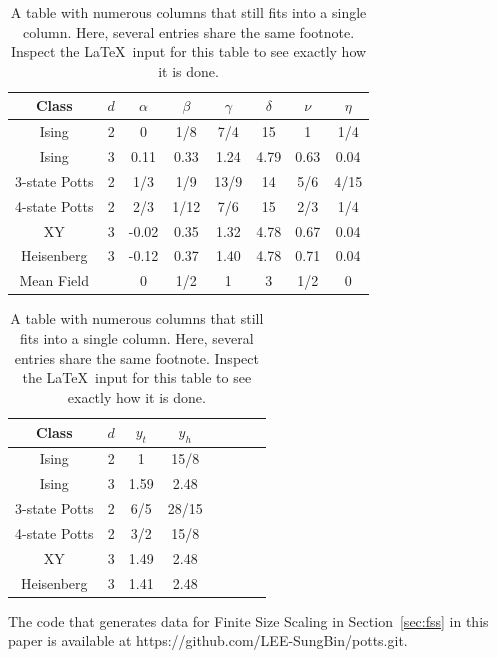 \documentclass[%
 reprint,
 amsmath,amssymb,
 aps,
]{revtex4-2}
\begin{document}
\begin{table}[b]
\caption{\label{tab:universality}
A table with numerous columns that still fits into a single column. 
Here, several entries share the same footnote. 
Inspect the \LaTeX\ input for this table to see exactly how it is done.}
\begin{ruledtabular}
\begin{tabular}{cccccccc}
Class &$d$ &$\alpha$ &$\beta $&$\gamma $&
$\delta$ &$\nu$ &$\eta$ \\
\hline
Ising & 2 & 0 & 1/8 & 7/4
& 15 & 1 & 1/4 \\
Ising & 3 & 0.11 & 0.33 & 1.24
& 4.79 & 0.63 & 0.04 \\
3-state Potts & 2 & 1/3 & 1/9 & 13/9
& 14 & 5/6 & 4/15 \\
4-state Potts & 2 & 2/3 & 1/12 & 7/6
& 15 & 2/3 & 1/4 \\
XY & 3 & -0.02 & 0.35 & 1.32
& 4.78 & 0.67 & 0.04 \\
Heisenberg & 3 & -0.12 & 0.37 & 1.40
& 4.78 & 0.71 & 0.04 \\
Mean Field &  & 0 & 1/2 & 1
& 3 & 1/2 & 0 \\
\end{tabular}
\end{ruledtabular}
\end{table}

\begin{table}[b]
\caption{\label{tab:exponent}
A table with numerous columns that still fits into a single column. 
Here, several entries share the same footnote. 
Inspect the \LaTeX\ input for this table to see exactly how it is done.}
\begin{ruledtabular}
\begin{tabular}{cccccccc}
Class &$d$ &$y_{t}$ &$y_{h}$\\
\hline
Ising & 2 & 1 & 15/8 \\
Ising & 3 & 1.59 & 2.48 \\
3-state Potts & 2 & 6/5 & 28/15 \\
4-state Potts & 2 & 3/2 & 15/8 \\
XY & 3 & 1.49 & 2.48 \\
Heisenberg & 3 & 1.41 & 2.48 \\
\end{tabular}
\end{ruledtabular}
\end{table}

\begin{acknowledgments}
The code that generates data for Finite Size Scaling in Section~\ref{sec:fss} in this paper
is available at https://github.com/LEE-SungBin/potts.git.
\end{acknowledgments}
\end{document}
